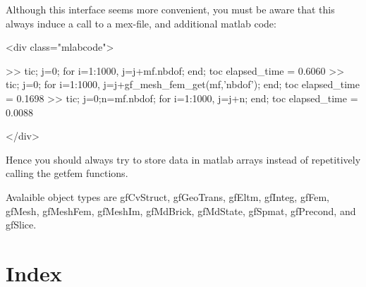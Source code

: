 \documentclass[11pt,a4paper]{article}
\newcommand{\hypertarget}[1]{\label{#1}}
\newcommand{\sf}[1]{#1}
\newenvironment{matlab}{\begin{rawxml}<div class="mlabcode">\end{rawxml}\begin{example}}{\end{example}\begin{rawxml}</div>\end{rawxml}}
\newenvironment{matlab}{\begin{alltt}}{\end{alltt}}
\newcommand{\mlab}{{\sf matlab}\xspace}
\begin{document}
Although this interface seems more convenient, you must be aware that this
always induce a call to a mex-file, and additional \mlab code:
\begin{matlab}
>> tic; j=0; for i=1:1000, j=j+mf.nbdof; end; toc
elapsed_time =
    0.6060
>> tic; j=0; for i=1:1000, j=j+gf_mesh_fem_get(mf,'nbdof'); end; toc
elapsed_time =
    0.1698
>> tic; j=0;n=mf.nbdof;  for i=1:1000, j=j+n; end; toc                           
elapsed_time =
    0.0088
\end{matlab}

Hence you should always try to store data in \mlab arrays instead of repetitively
calling the getfem functions.


Avalaible object types are \hypertarget{gfCvStruct}gfCvStruct, 
\hypertarget{gfGeoTrans}gfGeoTrans, 
\hypertarget{gfEltm}gfEltm, 
\hypertarget{gfInteg}gfInteg, 
\hypertarget{gfFem}gfFem, 
\hypertarget{gfMesh}gfMesh, 
\hypertarget{gfMeshFem}gfMeshFem, 
\hypertarget{gfMeshIm}gfMeshIm, 
\hypertarget{gfMdBrick}gfMdBrick, 
\hypertarget{gfMdState}gfMdState, 
\hypertarget{gfSpmat}gfSpmat, 
\hypertarget{gfPrecond}gfPrecond, 
\hypertarget{gfSlice}and gfSlice.



\W \section*{Index}
\texorhtml{}{\label{gfmindex}\htmlprintindex}
\end{document}
